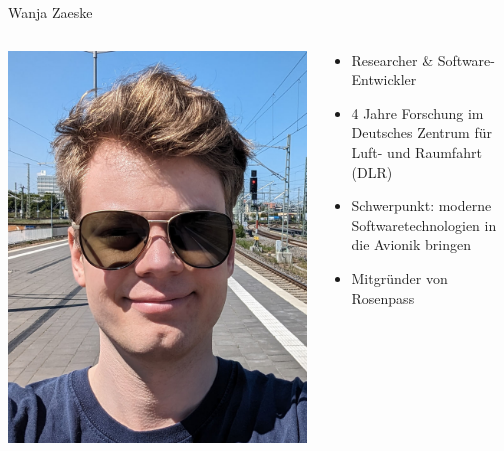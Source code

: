 \begin{frame}{Wanja Zaeske}
  \begin{columns}[fullwidth,c]
    \begin{column}{.3\linewidth}
      \includegraphics[width=.92\linewidth]{graphics/wanja-zaeske.png}
    \end{column}
    \begin{column}{.7\linewidth}
      \begin{itemize}
        \item Researcher \& Software-Entwickler
        \item 4 Jahre Forschung im Deutsches Zentrum für Luft- und Raumfahrt (DLR)
        \item Schwerpunkt: moderne Softwaretechnologien in die Avionik bringen
        \item Mitgründer von Rosenpass
      \end{itemize}
    \end{column}%
  \end{columns}
\end{frame}

